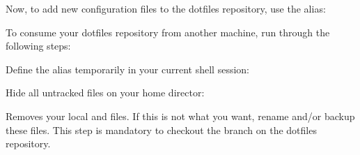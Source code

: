 \begin{flushleft}
	Now, to add new configuration files to the dotfiles repository, use the  alias:
\end{flushleft}

\begin{flushleft}
\end{flushleft}
\vspace{-0.6cm}
\begin{flushleft}
\end{flushleft}
\vspace{-0.6cm}
\begin{flushleft}
\end{flushleft}

\begin{flushleft}
	To consume your dotfiles repository from another machine, run through the following steps:
\end{flushleft}

\begin{flushleft}
\end{flushleft}
\vspace{-0.6cm}
\begin{flushleft}
\end{flushleft}

\begin{flushleft}
	Define the  alias temporarily in your current shell session:
\end{flushleft}

\begin{flushleft}
	\hbox{}
\end{flushleft}

\begin{flushleft}
	Hide all untracked files on your home director:
\end{flushleft}

\begin{flushleft}
\end{flushleft}

\begin{flushleft}
	Removes	your local  and  files.
	If this is not what you want, rename and/or backup these files. This step is
	mandatory to checkout the branch on the dotfiles repository.
\end{flushleft}

\begin{flushleft}
\end{flushleft}
\vspace{-0.6cm}
\begin{flushleft}
\end{flushleft}
\vspace{-0.6cm}
\begin{flushleft}
\end{flushleft}
